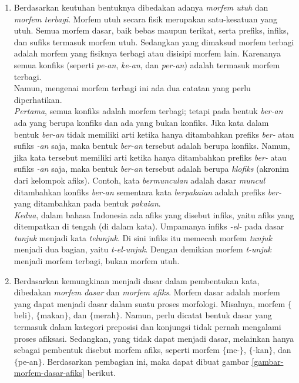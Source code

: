 \begin{enumerate}
	\item Berdasarkan keutuhan bentuknya dibedakan adanya \textit{morfem utuh} dan \textit{morfem terbagi}. Morfem utuh secara fisik merupakan satu-kesatuan yang utuh. Semua morfem dasar, baik bebas maupun terikat, serta prefiks, infiks, dan sufiks termasuk morfem utuh. Sedangkan yang dimaksud morfem terbagi adalah morfem yang fisiknya terbagi atau disisipi morfem lain. Karenanya semua konfiks (seperti \textit{pe-an}, \textit{ke-an}, dan \textit{per-an}) adalah termasuk morfem terbagi. \\
	Namun, mengenai morfem terbagi ini ada dua catatan yang perlu diperhatikan.\\
	\textit{Pertama}, semua konfiks adalah morfem terbagi; tetapi pada bentuk \textit{ber-an} ada yang berupa konfiks dan ada yang bukan konfiks. Jika kata dalam bentuk \textit{ber-an} tidak memiliki arti ketika hanya ditambahkan prefiks \textit{ber-} atau sufiks \textit{-an} saja, maka bentuk \textit{ber-an} tersebut adalah berupa konfiks. Namun, jika kata tersebut memiliki arti ketika hanya ditambahkan prefiks \textit{ber-} atau sufiks \textit{-an} saja, maka bentuk \textit{ber-an} tersebut adalah berupa \textit{klofiks} (akronim dari kelompok afiks). Contoh, kata \textit{bermunculan} adalah dasar \textit{muncul} ditambahkan konfiks \textit{ber-an} sementara kata \textit{berpakaian} adalah prefiks \textit{ber-} yang ditambahkan pada bentuk \textit{pakaian}.\\
	\textit{Kedua}, dalam bahasa Indonesia ada afiks yang disebut infiks, yaitu afiks yang ditempatkan di tengah (di dalam kata). Umpamanya infiks \textit{-el-} pada dasar \textit{tunjuk} menjadi kata \textit{telunjuk}. Di sini infiks itu memecah morfem \textit{tunjuk} menjadi dua bagian, yaitu \textit{t-el-unjuk}. Dengan demikian morfem \textit{t-unjuk} menjadi morfem terbagi, bukan morfem utuh.
	
	\item Berdasarkan kemungkinan menjadi dasar dalam pembentukan kata, dibedakan \textit{morfem dasar} dan \textit{morfem afiks}. Morfem dasar adalah morfem yang dapat menjadi dasar dalam suatu proses morfologi. Misalnya, morfem $\lbrace$beli$\rbrace$, $\lbrace$makan$\rbrace$, dan $\lbrace$merah$\rbrace$. Namun, perlu dicatat bentuk dasar yang termasuk dalam kategori preposisi dan konjungsi tidak pernah mengalami proses afiksasi. Sedangkan, yang tidak dapat menjadi dasar, melainkan hanya sebagai pembentuk disebut morfem afiks, seperti morfem $\lbrace$me-$\rbrace$, $\lbrace$-kan$\rbrace$, dan $\lbrace$pe-an$\rbrace$. Berdasarkan pembagian ini, maka dapat dibuat gambar \ref{gambar-morfem-dasar-afiks} berikut.
	

\end{enumerate}
